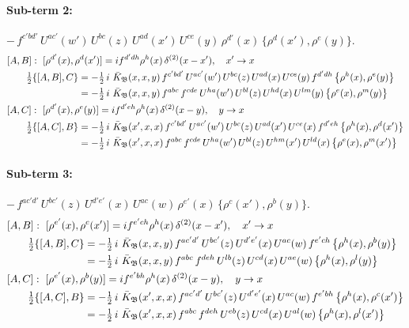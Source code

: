 \documentclass[10pt]{article}
\numberwithin{equation}{section}
\begin{document}
\paragraph{Sub-term 2:} $-\,f^{c'bd'}\,U^{ac'}(w')\,U^{bc}(z)\,U^{ad}(x')\,U^{ce}(y)\,\rho^{d'}(x)\,\big\{\rho^{d}(x'),\rho^{e}(y)\big\}$.
\begin{align}
&[A,B]:\ [\rho^{d'}(x),\rho^{d}(x')]=i f^{d'dh}\rho^{h}(x)\,\delta^{(2)}(x-x'),\quad x'\to x\notag\\
&\qquad \tfrac12\{[A,B],C\}=-\tfrac12\,i\,\,\bar K_{\mathfrak B}(x,x,y)\,f^{c'bd'}\,U^{ac'}(w')\,U^{bc}(z)\,U^{ad}(x)\,U^{ce}(y)\,f^{d'dh}\,\big\{\rho^{h}(x),\rho^{e}(y)\big\}\notag\\
&\qquad\phantom{\tfrac12\{[A,B],C\}}=-\tfrac12\,i\,\,\bar K_{\mathfrak B}(x,x,y)\,f^{abc}\,f^{cde}\,U^{ha}(w')\,U^{bl}(z)\,U^{hd}(x)\,U^{lm}(y)\,\big\{\rho^{e}(x),\rho^{m}(y)\big\}
\label{R:eq:GII.I2-2-AB}\\
&[A,C]:\ [\rho^{d'}(x),\rho^{e}(y)]=i f^{d'eh}\rho^{h}(x)\,\delta^{(2)}(x-y),\quad y\to x\notag\\
&\qquad \tfrac12\{[A,C],B\}=-\tfrac12\,i\,\,\bar K_{\mathfrak B}(x',x,x)\,f^{c'bd'}\,U^{ac'}(w')\,U^{bc}(z)\,U^{ad}(x')\,U^{ce}(x)\,f^{d'eh}\,\big\{\rho^{h}(x),\rho^{d}(x')\big\}\notag\\
&\qquad\phantom{\tfrac12\{[A,C],B\}}=-\tfrac12\,i\,\,\bar K_{\mathfrak B}(x',x,x)\,f^{abc}\,f^{cde}\,U^{ha}(w')\,U^{bl}(z)\,U^{hm}(x')\,U^{ld}(x)\,\big\{\rho^{e}(x),\rho^{m}(x')\big\}
\label{R:eq:GII.I2-2-AC}
\end{align}
\paragraph{Sub-term 3:} $-\,f^{ac'd'}\,U^{bc'}(z)\,U^{d'e'}(x)\,U^{ac}(w)\,\rho^{e'}(x)\,\big\{\rho^{c}(x'),\rho^{b}(y)\big\}$.
\begin{align}
&[A,B]:\ [\rho^{e'}(x),\rho^{c}(x')]=i f^{e'ch}\rho^{h}(x)\,\delta^{(2)}(x-x'),\quad x'\to x\notag\\
&\qquad \tfrac12\{[A,B],C\}=-\tfrac12\,i\,\,\bar K_{\mathfrak B}(x,x,y)\,f^{ac'd'}\,U^{bc'}(z)\,U^{d'e'}(x)\,U^{ac}(w)\,f^{e'ch}\,\big\{\rho^{h}(x),\rho^{b}(y)\big\}\notag\\
&\qquad\phantom{\tfrac12\{[A,B],C\}}=-\tfrac12\,i\,\,\bar K_{\mathfrak B}(x,x,y)\,f^{abc}\,f^{deh}\,U^{lb}(z)\,U^{cd}(x)\,U^{ae}(w)\,\big\{\rho^{h}(x),\rho^{l}(y)\big\}
\label{R:eq:GII.I2-3-AB}\\
&[A,C]:\ [\rho^{e'}(x),\rho^{b}(y)]=i f^{e'bh}\rho^{h}(x)\,\delta^{(2)}(x-y),\quad y\to x\notag\\
&\qquad \tfrac12\{[A,C],B\}=-\tfrac12\,i\,\,\bar K_{\mathfrak B}(x',x,x)\,f^{ac'd'}\,U^{bc'}(z)\,U^{d'e'}(x)\,U^{ac}(w)\,f^{e'bh}\,\big\{\rho^{h}(x),\rho^{c}(x')\big\}\notag\\
&\qquad\phantom{\tfrac12\{[A,C],B\}}=-\tfrac12\,i\,\,\bar K_{\mathfrak B}(x',x,x)\,f^{abc}\,f^{deh}\,U^{eb}(z)\,U^{cd}(x)\,U^{al}(w)\,\big\{\rho^{h}(x),\rho^{l}(x')\big\}
\label{R:eq:GII.I2-3-AC}
\end{align}
\end{document}
